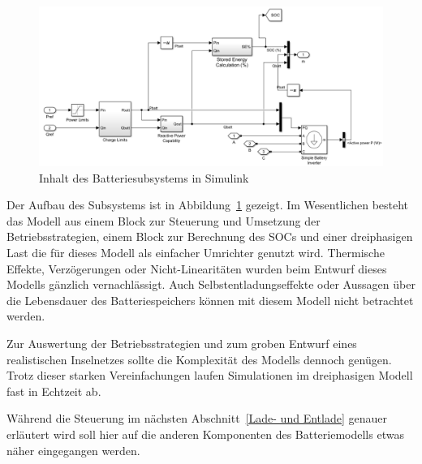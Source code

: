 \begin{figure}[h!]
    \centering
    \includegraphics[width=14cm]{Abbildungen/Speicher Ebene1.png}
    \caption{Inhalt des Batteriesubsystems in Simulink}\label{BatModell1}
\end{figure}

Der Aufbau des Subsystems ist in Abbildung~\ref{BatModell1} gezeigt.
Im Wesentlichen besteht das Modell aus einem Block zur Steuerung und Umsetzung der Betriebsstrategien, einem Block
zur Berechnung des SOCs und einer dreiphasigen Last die für dieses Modell als einfacher Umrichter genutzt wird.
Thermische Effekte, Verzögerungen oder Nicht-Linearitäten wurden beim Entwurf dieses Modells gänzlich vernachlässigt.
Auch Selbstentladungseffekte oder Aussagen über die Lebensdauer des Batteriespeichers können mit diesem Modell nicht 
betrachtet werden.

Zur Auswertung der Betriebsstrategien und zum groben Entwurf eines realistischen Inselnetzes sollte die Komplexität
des Modells dennoch genügen.
Trotz dieser starken Vereinfachungen laufen Simulationen im dreiphasigen Modell fast in Echtzeit ab.

Während die Steuerung im nächsten Abschnitt~\ref{Lade- und Entlade} genauer erläutert wird soll hier auf die anderen
Komponenten des Batteriemodells etwas näher eingegangen werden.

